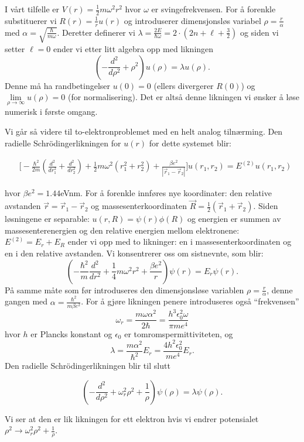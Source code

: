 \documentclass[norsk, 12pt]{article}
\newcommand{\f}{\frac}
\begin{document}
I vårt tilfelle er $V(r) = \f{1}{2}m\omega^2r^2$ hvor $\omega$ er svingefrekvensen. For å forenkle
substituerer vi $R(r)= \f{1}{r}u(r)$ og introduserer dimensjonsløs variabel $\rho = \f{r}{\alpha}$ med
$\alpha = \sqrt{\f{\hbar}{m\omega}}$. Deretter definerer vi $\lambda = \f{2E}{\hbar\omega} = 2\cdot(2n+\ell+\f{3}{2})$ og siden vi
setter $\ell=0$ ender vi etter litt algebra opp med likningen
$$\left(-\f{d^2}{d\rho^2}+\rho^2\right)u(\rho) = \lambda u(\rho).$$
Denne må ha randbetingelser $u(0)=0$ (ellers divergerer $R(0)$) og $\lim\limits_{\rho\rightarrow\infty}u(\rho)=0$ 
(for normalisering). Det er altså denne likningen vi ønsker å løse numerisk i første omgang.

Vi går så videre til to-elektronproblemet med en helt analog tilnærming. 
Den radielle Schrödingerlikningen for $u(r)$ for dette systemet blir:

\begin{align*}
 &\bigg[-\f{\hbar^2}{2m}\left(\f{d^2}{dr_1^2}+\f{d^2}{dr_2^2}\right)+\f{1}{2}m\omega^2\left(r_1^2+r_2^2\right)+ \f{\beta e^2}{|\vec r_1-\vec r_2|}\bigg]u(r_1,r_2) = E^{(2)}u(r_1,r_2)
\end{align*}

hvor $\beta e^2=1.44$eVnm.
For å forenkle innføres nye koordinater: den relative avstanden $\vec r = \vec r_1-\vec r_2$ og massesenterkoordinaten
$\vec R=\f{1}{2}(\vec r_1+\vec r_2)$. Siden løsningene er separable: $u(r,R) = \psi(r)\phi(R)$ og  energien er summen
av massesenterenergien og den relative energien mellom elektronene: $E^{(2)}=E_r+E_R$ ender vi opp med to likninger:
en i massesenterkoordinaten og en i den relative avstanden. Vi konsentrerer oss om sistnevnte, som blir:
$$\left(-\f{\hbar^2}{m}\f{d^2}{dr^2}+\f{1}{4}m\omega^2r^2+\f{\beta e^2}{r}\right)\psi(r)=E_r\psi(r).$$
På samme måte som før introduseres den dimensjonsløse variablen $\rho = \f{r}{\alpha}$, denne gangen med 
$\alpha = \f{\hbar^2}{m\beta e^2}$. For å gjøre likningen penere introduseres også ``frekvensen''
$$\omega_r = \f{m\omega\alpha^2}{2\hbar} = \f{ h^3\epsilon_0^2\omega}{\pi me^4}$$ hvor $h$ er Plancks konstant og $\epsilon_0$
er tomromspermittiviteten, og 
$$\lambda = \f{m\alpha^2}{\hbar^2}E_r = \f{4h^2\epsilon_0^2}{m e^4}E_r.$$
Den radielle Schrödingerlikningen blir til slutt

$$\left(-\f{d^2}{d\rho^2}+\omega_r^2\rho^2+\f{1}{\rho}\right)\psi(\rho) = \lambda\psi(\rho).$$

Vi ser at den er lik likningen for ett elektron hvis vi endrer potensialet $\rho^2\rightarrow \omega_r^2\rho^2+\f{1}{\rho}$.
\end{document}
